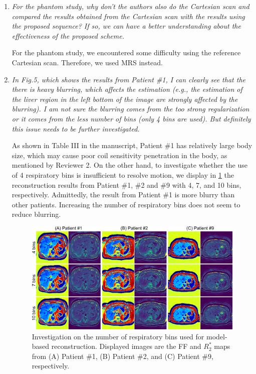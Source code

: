 \documentclass[a4paper,11pt]{report}
\begin{document}
\begin{enumerate}[resume]

	\item \textit{For the phantom study, why don't the authors also do the Cartesian scan and compared the results obtained from the Cartesian scan with the results using the proposed sequence? If so, we can have a better understanding about the effectiveness of the proposed scheme.}

\hspace{1em} For the phantom study, we encountered some difficulty using the reference Cartesian scan. 
Therefore, we used MRS instead.

	\item \textit{In Fig.5, which shows the results from Patient \#1, I can clearly see that the there is heavy blurring, which affects the estimation (e.g., the estimation of the liver region in the left bottom of the image are strongly affected by the blurring). I am not sure the blurring comes from the too strong regularization or it comes from the less number of bins (only 4 bins are used). But definitely this issue needs to be further investigated.}

\hspace{1em} As shown in Table III in the manuscript, Patient \#1 has relatively large body size, 
which may cause poor coil sensitivity penetration in the body, as mentioned by Reviewer 2. 
On the other hand, to investigate whether the use of 4 respiratory bins is insufficient 
to resolve motion, we display in \cref{SUPPFIG:BINS} the reconstruction results 
from Patient \#1, \#2 and \#9 with 4, 7, and 10 bins, respectively.
Admittedly, the result from Patient \#1 is more blurry than other patients. 
Increasing the number of respiratory bins does not seem to reduce blurring. 


\begin{figure}[t]
	\centering
	\includegraphics[width=\textwidth]{../../figures/supp_tan4.png}
	\caption{Investigation on the number of respiratory bins used for model-based reconstruction.
	Displayed images are the FF and $R_2^*$ maps from (A) Patient \#1, (B) Patient \#2, and (C) Patient \#9, respectively.}
	\label{SUPPFIG:BINS}
\end{figure}


\end{enumerate}
\end{document}
